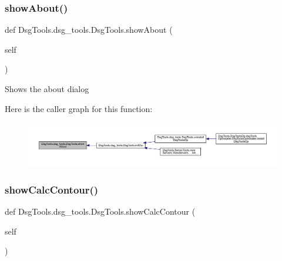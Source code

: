 \subsubsection{\texorpdfstring{show\+About()}{showAbout()}}
{\footnotesize\ttfamily def Dsg\+Tools.\+dsg\+\_\+tools.\+Dsg\+Tools.\+show\+About (\begin{DoxyParamCaption}\item[{}]{self }\end{DoxyParamCaption})}

\begin{DoxyVerb}Shows the about dialog
\end{DoxyVerb}
 Here is the caller graph for this function\+:
\nopagebreak
\begin{figure}[H]
\begin{center}
\leavevmode
\includegraphics[width=350pt]{class_dsg_tools_1_1dsg__tools_1_1_dsg_tools_a9040f837b61d2ecf1be25d3b2d0e1094_icgraph}
\end{center}
\end{figure}
\mbox{\label{class_dsg_tools_1_1dsg__tools_1_1_dsg_tools_a0b23a5c6211556c29aeccba77b404a90}} 
\subsubsection{\texorpdfstring{show\+Calc\+Contour()}{showCalcContour()}}
{\footnotesize\ttfamily def Dsg\+Tools.\+dsg\+\_\+tools.\+Dsg\+Tools.\+show\+Calc\+Contour (\begin{DoxyParamCaption}\item[{}]{self }\end{DoxyParamCaption})}

